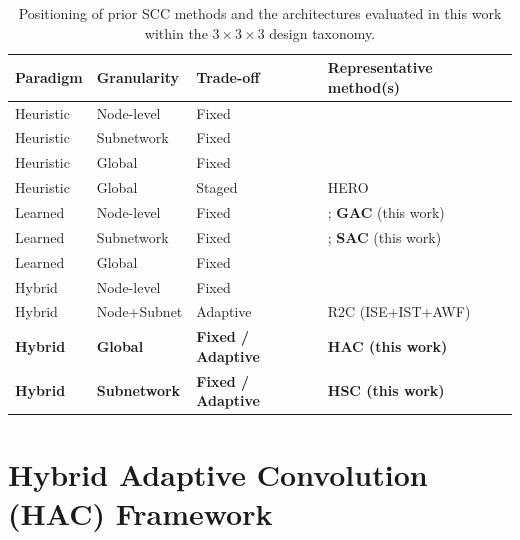 \documentclass[11pt]{article}
\theoremstyle{plain}
\theoremstyle{definition}
\theoremstyle{remark}
\begin{document}
\begin{table}[t]
\centering
\caption{Positioning of prior SCC methods and the architectures evaluated in this work within the $3\times3\times3$ design taxonomy.}
\label{tab:taxonomy}
\small
\begin{tabular}{@{}lllp{5.5cm}@{}}
\toprule
Paradigm & Granularity & Trade-off & Representative method(s) \\
\midrule
Heuristic & Node-level    & Fixed    & \citet{akkaya2009distributed,mi2015obstacle,wang2024apfcpp} \\
Heuristic & Subnetwork    & Fixed    & \citet{chen2020sidr} \\
Heuristic & Global        & Fixed    & \citet{lin2025multihop} \\
Heuristic & Global        & Staged   & HERO \citep{mi2011hero} \\
Learned   & Node-level    & Fixed    & \citet{mou2022resilient}; \textbf{GAC} (this work) \\
Learned   & Subnetwork    & Fixed    & \citet{lin2024multihop}; \textbf{SAC} (this work) \\
Learned   & Global        & Fixed    & \citet{guo2024intelligent} \\
Hybrid    & Node-level    & Fixed    & \citet{li2025fast} \\
Hybrid    & Node+Subnet   & Adaptive & R2C (ISE+IST+AWF) \citep{peng2026r2c} \\
\textbf{Hybrid} & \textbf{Global} & \textbf{Fixed / Adaptive} & \textbf{HAC (this work)} \\
\textbf{Hybrid} & \textbf{Subnetwork} & \textbf{Fixed / Adaptive} & \textbf{HSC (this work)} \\
\bottomrule
\end{tabular}
\end{table}

\section{Hybrid Adaptive Convolution (HAC) Framework}
\label{sec:method}
\label{sec:motivating}
\end{document}
